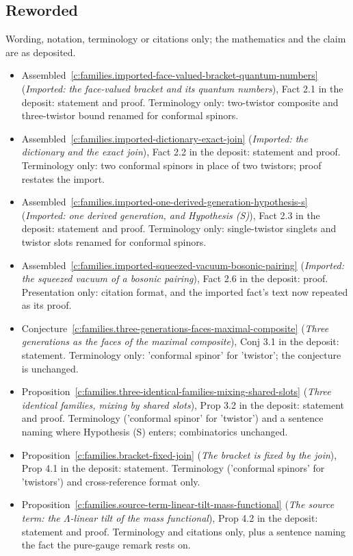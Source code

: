 \documentclass[11pt]{article}
\theoremstyle{definition}
\theoremstyle{plain}
\begin{document}
\subsection*{Reworded}
Wording, notation, terminology or citations only; the mathematics and the claim are as deposited.
\begin{itemize}\setlength{\itemsep}{2pt}
\item Assembled~\ref{c:families.imported-face-valued-bracket-quantum-numbers} (\emph{Imported: the face-valued bracket and its quantum numbers}), Fact 2.1 in the deposit: statement and proof. Terminology only: two-twistor composite and three-twistor bound renamed for conformal spinors.
\item Assembled~\ref{c:families.imported-dictionary-exact-join} (\emph{Imported: the dictionary and the exact join}), Fact 2.2 in the deposit: statement and proof. Terminology only: two conformal spinors in place of two twistors; proof restates the import.
\item Assembled~\ref{c:families.imported-one-derived-generation-hypothesis-s} (\emph{Imported: one derived generation, and Hypothesis (S)}), Fact 2.3 in the deposit: statement and proof. Terminology only: single-twistor singlets and twistor slots renamed for conformal spinors.
\item Assembled~\ref{c:families.imported-squeezed-vacuum-bosonic-pairing} (\emph{Imported: the squeezed vacuum of a bosonic pairing}), Fact 2.6 in the deposit: proof. Presentation only: citation format, and the imported fact's text now repeated as its proof.
\item Conjecture~\ref{c:families.three-generations-faces-maximal-composite} (\emph{Three generations as the faces of the maximal composite}), Conj 3.1 in the deposit: statement. Terminology only: 'conformal spinor' for 'twistor'; the conjecture is unchanged.
\item Proposition~\ref{c:families.three-identical-families-mixing-shared-slots} (\emph{Three identical families, mixing by shared slots}), Prop 3.2 in the deposit: statement and proof. Terminology ('conformal spinor' for 'twistor') and a sentence naming where Hypothesis (S) enters; combinatorics unchanged.
\item Proposition~\ref{c:families.bracket-fixed-join} (\emph{The bracket is fixed by the join}), Prop 4.1 in the deposit: statement. Terminology ('conformal spinors' for 'twistors') and cross-reference format only.
\item Proposition~\ref{c:families.source-term-linear-tilt-mass-functional} (\emph{The source term: the $\Lambda$-linear tilt of the mass functional}), Prop 4.2 in the deposit: statement and proof. Terminology and citations only, plus a sentence naming the fact the pure-gauge remark rests on.

\end{itemize}
\end{document}
